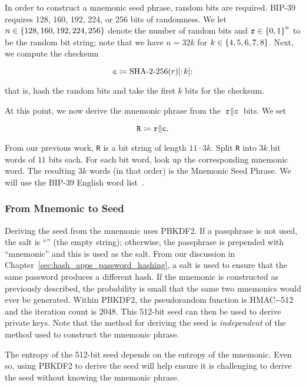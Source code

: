 In order to construct a mnemonic seed phrase, random bits are required.
BIP-39 requires 128, 160, 192, 224, or 256 bits of randomness.
We let $n\in\left\{ 128, 160, 192, 224, 256 \right\}$ denote the number
of random bits and $\texttt{r}\in\left\{ 0,1 \right\}^{n}$ to be the random bit string;
note that we have $n = 32k$ for $k\in\left\{ 4,5,6,7,8 \right\}$.
Next, we compute the checksum

\begin{equation}
    \texttt{c} \mathDef{} \text{\ShaTwo{}-256}(r)[:\!k];
\end{equation}

\noindent
that is, hash the random bits and take the first $k$ bits for the checksum.

At this point, we now derive the mnemonic phrase from the
$\texttt{r}\|\texttt{c}$ bits.
We set

\begin{equation}
    \texttt{R} \coloneqq{} \texttt{r}\|\texttt{c}.
\end{equation}

\noindent
From our previous work, \texttt{R} is a bit string of length $11\cdot3k$.
Split \texttt{R} into $3k$ bit words of $11$ bits each.
For each bit word, look up the corresponding mnemonic word.
The resulting $3k$ words (in that order) is the Mnemonic Seed Phrase.
We will use the BIP-39 English word list~\cite{BIP-39-wordlist}.

\subsubsection{From Mnemonic to Seed}

Deriving the seed from the mnemonic uses PBKDF2.
If a passphrase is not used, the \gls{salt} is ``'' (the empty string);
otherwise, the passphrase is prepended with ``mnemonic'' and
this is used as the \gls{salt}.
From our discussion in Chapter~\ref{sec:hash_apps_password_hashing},
a \gls{salt} is used to ensure that the same password produces
a different hash.
If the mnemonic is constructed as previously described,
the probability is small that the same two mnemonics would ever be generated.
Within PBKDF2, the pseudorandom function is HMAC-\ShaTwo{}-512
and the iteration count is 2048.
This 512-bit seed can then be used to derive private keys.
Note that the method for deriving the seed is \emph{independent}
of the method used to construct the mnemonic phrase.

The entropy of the 512-bit seed depends on the entropy of the mnemonic.
Even so, using PBKDF2 to derive the seed will help ensure
it is challenging to derive the seed without knowing the mnemonic phrase.

